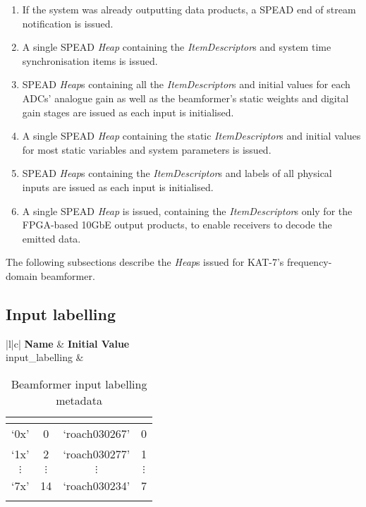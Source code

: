 \documentclass[11pt,english,twoside]{article}
\begin{document}
\begin{enumerate}
\item If the system was already outputting data products, a SPEAD end of stream notification is issued.
\item A single SPEAD \emph{Heap} containing the \emph{ItemDescriptor}s and system time synchronisation items is issued.
\item SPEAD \emph{Heap}s containing all the \emph{ItemDescriptor}s and initial values for each ADCs' analogue gain as well as the beamformer's static weights and digital gain stages are issued as each input is initialised.
\item A single SPEAD \emph{Heap} containing the static \emph{ItemDescriptor}s and initial values for most static variables and system parameters is issued.
\item SPEAD \emph{Heap}s containing the \emph{ItemDescriptor}s and labels of all physical inputs are issued as each input is initialised.
\item A single SPEAD \emph{Heap} is issued, containing the \emph{ItemDescriptor}s only for the FPGA-based 10GbE output products, to enable receivers to decode the emitted data.
\end{enumerate}

The following subsections describe the \emph{Heap}s issued for KAT-7's frequency-domain beamformer.

\subsection{Input labelling}
\begin{table}[htbp]
\caption{Beamformer input labelling metadata}
\begin{center}
\begin{tabular}{|l|c|} \hline
{\bf Name}        & {\bf Initial Value} \\ \hline
input\_labelling & 

\begin{tabular}{|c|c|c|c|}
\multicolumn{1}{c}{} & \multicolumn{1}{c}{} & \multicolumn{1}{c}{} & \multicolumn{1}{c}{}\\ \hline
`0x' & 0 & `roach030267' & 0\\ \hline
`1x' & 2 & `roach030277' & 1\\ \hline
$\vdots$  & $\vdots$ & $\vdots$ & $\vdots$ \\ \hline
`7x' & 14 & `roach030234' & 7\\ \hline
\multicolumn{1}{c}{} & \multicolumn{1}{c}{} & \multicolumn{1}{c}{} & \multicolumn{1}{c}{}\\
\end{tabular}
\\ \hline
\end{tabular}
\end{center}
\label{tab:bflabelling}
\end{table}%
\end{document}
